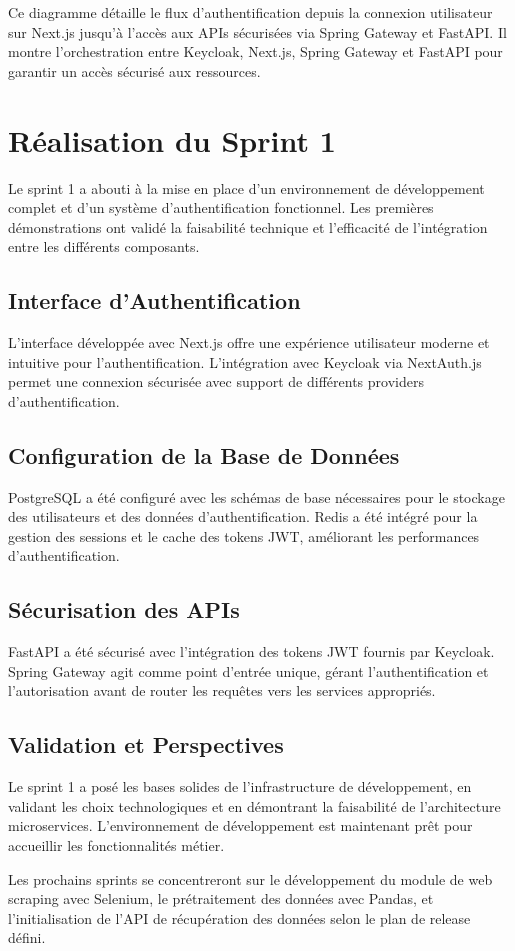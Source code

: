 Ce diagramme détaille le flux d'authentification depuis la connexion utilisateur sur Next.js jusqu'à l'accès aux APIs sécurisées via Spring Gateway et FastAPI. Il montre l'orchestration entre Keycloak, Next.js, Spring Gateway et FastAPI pour garantir un accès sécurisé aux ressources.

\section{Réalisation du Sprint 1}

Le sprint 1 a abouti à la mise en place d'un environnement de développement complet et d'un système d'authentification fonctionnel. Les premières démonstrations ont validé la faisabilité technique et l'efficacité de l'intégration entre les différents composants.

\subsection{Interface d'Authentification}

L'interface développée avec Next.js offre une expérience utilisateur moderne et intuitive pour l'authentification. L'intégration avec Keycloak via NextAuth.js permet une connexion sécurisée avec support de différents providers d'authentification.

\subsection{Configuration de la Base de Données}

PostgreSQL a été configuré avec les schémas de base nécessaires pour le stockage des utilisateurs et des données d'authentification. Redis a été intégré pour la gestion des sessions et le cache des tokens JWT, améliorant les performances d'authentification.

\subsection{Sécurisation des APIs}

FastAPI a été sécurisé avec l'intégration des tokens JWT fournis par Keycloak. Spring Gateway agit comme point d'entrée unique, gérant l'authentification et l'autorisation avant de router les requêtes vers les services appropriés.

\subsection{Validation et Perspectives}

Le sprint 1 a posé les bases solides de l'infrastructure de développement, en validant les choix technologiques et en démontrant la faisabilité de l'architecture microservices. L'environnement de développement est maintenant prêt pour accueillir les fonctionnalités métier.

Les prochains sprints se concentreront sur le développement du module de web scraping avec Selenium, le prétraitement des données avec Pandas, et l'initialisation de l'API de récupération des données selon le plan de release défini.